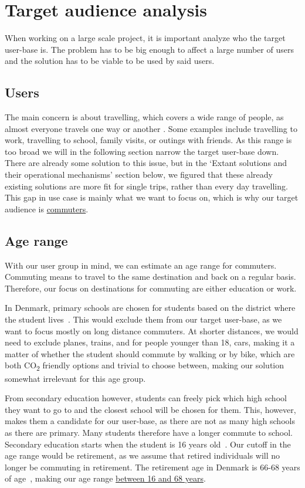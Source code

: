 \section{Target audience analysis}\label{sec:target-audience-analysis}

When working on a large scale project, it is important analyze who the target user-base is.
The problem has to be big enough to affect a large number of users and the solution has to be viable to be used by said
users.

\subsection{Users}\label{subsec:users}

The main concern is about travelling, which covers a wide range of people, as almost everyone travels one way or another
.
Some examples include travelling to work, travelling to school, family visits, or outings with friends.
As this range is too broad we will in the following section narrow the target user-base down.
There are already some solution to this issue, but in the `Extant solutions and their operational mechanisms' section
below, we figured that these already existing solutions are more fit for single trips, rather than every day travelling.
This gap in use case is mainly what we want to focus on, which is why our target audience is \underline{commuters}.

\subsection{Age range}\label{subsec:age-range}

With our user group in mind, we can estimate an age range for commuters.
Commuting means to travel to the same destination and back on a regular basis.
Therefore, our focus on destinations for commuting are either education or work.

In Denmark, primary schools are chosen for students based on the district where the student lives~\cite{primary_school}.
This would exclude them from our target user-base, as we want to focus mostly on long distance commuters.
At shorter distances, we would need to exclude planes, trains, and for people younger than 18, cars, making it a matter
of whether the student should commute by walking or by bike, which are both \unit{CO_{2}} friendly options and trivial
to choose between, making our solution somewhat irrelevant for this age group.

From secondary education however, students can freely pick which high school they want to go to and the closest school
will be chosen for them.
This, however, makes them a candidate for our user-base, as there are not as many high schools as there are primary.
Many students therefore have a longer commute to school.
Secondary education starts when the student is 16 years old~\cite{secondary_school}.
Our cutoff in the age range would be retirement, as we assume that retired individuals will no longer be commuting in
retirement.
The retirement age in Denmark is 66-68 years of age~\cite{retirement}, making our age range
\underline{between 16 and 68 years}.

